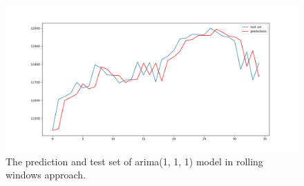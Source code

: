 \begin{figure}[H]
    \centering
    \begin{minipage}[b]{1\textwidth}
        \includegraphics[width=\textwidth]{manuscript/src/figures/Ass2/Ass2_Q2_Rolling_Forecast.png}
    \end{minipage}
    \caption{The prediction and test set of \gls{arima}(1, 1, 1) model in rolling windows approach.}
    \label{fig:Ass2_Q2_Rolling_Forecast}
\end{figure}




